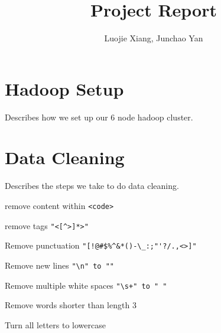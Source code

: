 \documentclass{article}
\begin{document}
\title{Project Report}
\author{Luojie Xiang, Junchao Yan}
\date{}
\maketitle

\section{Hadoop Setup}

Describes how we set up our 6 node hadoop cluster.

\section{Data Cleaning}

Describes the steps we take to do data cleaning.

remove content within \verb+<code>+

remove tags \verb+"<[^>]*>"+

Remove punctuation \verb+"[!@#$%^&*()-\_:;"'?/.,<>]"+

Remove new lines \verb+"\n" to ""+

Remove multiple white spaces \verb-"\s+" to " "-

Remove words shorter than length 3

Turn all letters to lowercase
\end{document}
